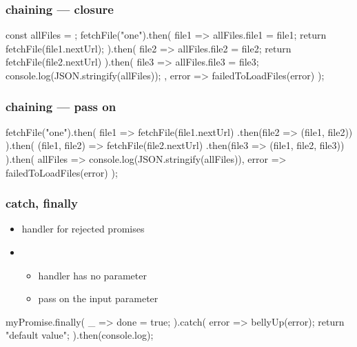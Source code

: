 \begin{frame}[fragile] \frametitle{chaining --- closure}
\begin{CodeBox}{}
const allFiles = {};
fetchFile("one").then(
  file1 => {
    allFiles.file1 = file1;
    return fetchFile(file1.nextUrl);
  }
).then(
  file2 => {
    allFiles.file2 = file2;
    return fetchFile(file2.nextUrl)
  }
).then(
  file3 => {
    allFiles.file3 = file3;
    console.log(JSON.stringify(allFiles));
  },
  error => failedToLoadFiles(error)
);
\end{CodeBox}
\end{frame}

\begin{frame}[fragile] \frametitle{chaining --- pass on}
\begin{CodeBox}{}
fetchFile("one").then(
  file1 => fetchFile(file1.nextUrl)
                .then(file2 => ({file1, file2}))
).then(
  ({file1, file2}) => fetchFile(file2.nextUrl)
                            .then(file3 => ({file1, file2, file3}))
).then(
  allFiles => console.log(JSON.stringify(allFiles)),
  error => failedToLoadFiles(error)
);
\end{CodeBox}
\end{frame}

\begin{frame}[fragile] \frametitle{catch, finally}
\begin{itemize}
  \item {} handler for rejected promises
  \item {}
  \begin{itemize}
    \item handler has no parameter
    \item pass on the input parameter
  \end{itemize}
\end{itemize}
\vspace{5mm}
\begin{CodeBox}{}
myPromise.finally(
  _ => { done = true; }
).catch(
 error => {
   bellyUp(error);
   return "default value";
 }
).then(console.log);
\end{CodeBox}
\end{frame}

